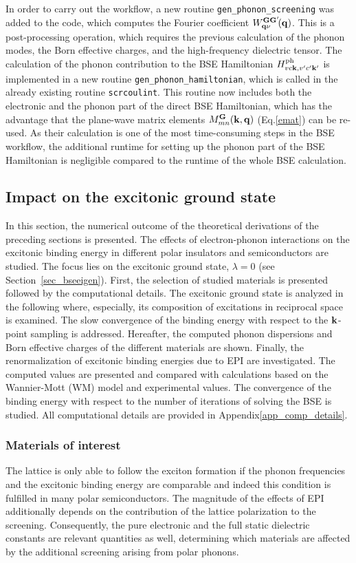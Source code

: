 In order to carry out the workflow, a new routine \texttt{gen\_phonon\_screening} was added to the \exciting{} code, which computes the Fourier coefficient $W_{\mathbf{q}\nu}^{\mathbf{GG'}}\!(\mathbf{q})$. This is a  post-processing operation, which requires the previous calculation of the phonon modes, the Born effective charges, and the high-frequency dielectric tensor. The calculation of the phonon contribution to the BSE Hamiltonian $H^\text{ph}_{vc\mathbf{k},v'c'\mathbf{k'}}$ is implemented in a new routine \texttt{gen\_phonon\_hamiltonian}, which is called in the already existing routine \texttt{scrcoulint}.  This routine now includes both the electronic and the phonon part of the direct BSE Hamiltonian, which has the advantage that the plane-wave matrix elements $M^{\mathbf{G}}_{mn}(\mathbf{k,q})$ (Eq.\;\eqref{emat}) can be re-used. As their calculation is one of the most time-consuming steps in the BSE workflow, the additional runtime for setting up the phonon part of the BSE Hamiltonian is negligible compared to the runtime of the whole BSE calculation.

\subsection{Impact on the excitonic ground state}\label{result_sec}
In this section, the numerical outcome of the theoretical derivations of the preceding sections is presented. The effects of electron-phonon interactions on the excitonic binding energy in different polar insulators and semiconductors are studied. The focus lies on the excitonic ground state, $\lambda=0$ (see Section~\ref{sec_bseeigen}). First, the selection of studied materials is presented followed by the computational details. The excitonic ground state is analyzed in the following where, especially, its composition of excitations in reciprocal space is examined. The slow convergence of the binding energy with respect to the $\mathbf{k}$-point sampling is addressed. Hereafter, the computed phonon dispersions and Born effective charges of the different materials are shown. Finally, the renormalization of excitonic binding energies due to EPI are investigated. The computed values are presented and compared with calculations based on the Wannier-Mott (WM) model and experimental values. The convergence of the binding energy with respect to the number of iterations of solving the BSE is studied. All computational details are provided in Appendix\;\ref{app_comp_details}.

\subsubsection{Materials of interest}
The lattice is only able to follow the exciton formation if the phonon frequencies and the excitonic binding energy are comparable and indeed this condition is fulfilled  in many polar semiconductors. The magnitude of the effects of EPI additionally depends on the contribution of the lattice polarization to the screening. Consequently, the pure electronic  and the full static dielectric constants are relevant quantities as well, determining which materials are affected by the additional screening arising from polar phonons.

